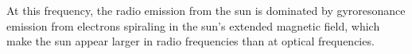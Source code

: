 At this frequency, the radio emission from the sun is dominated by gyroresonance emission from electrons spiraling in the sun's extended magnetic field, which make the sun appear larger in radio frequencies than at optical frequencies.
